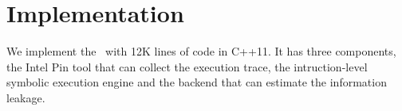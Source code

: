 \section{Implementation}
We implement the \tana\ with 12K lines of code in C++11. It has three components, the Intel
Pin tool that can collect the execution trace, the intruction-level symbolic execution
engine and the backend that can estimate the information leakage. 
